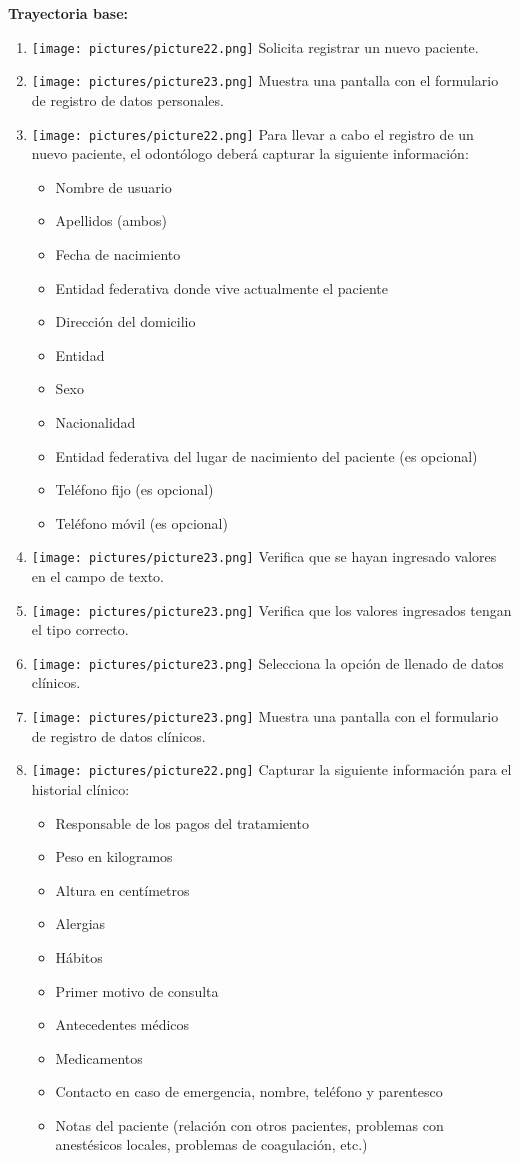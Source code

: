 \textbf{Trayectoria base:}        
\begin{enumerate}
\item \texttt{[image: pictures/picture22.png]} Solicita registrar un nuevo paciente.
\item \texttt{[image: pictures/picture23.png]} Muestra una pantalla con el formulario de registro de datos personales.
\item \texttt{[image: pictures/picture22.png]} Para llevar a cabo el registro de un nuevo paciente, el odontólogo deberá capturar la siguiente información:

\begin{itemize}[nosep]
\item Nombre de usuario
\item Apellidos (ambos)
\item Fecha de nacimiento
\item Entidad federativa donde vive actualmente el paciente
\item Dirección del domicilio
\item Entidad 
\item Sexo
\item Nacionalidad
\item Entidad federativa del lugar de nacimiento del paciente (es opcional)
\item Teléfono fijo (es opcional)
\item Teléfono móvil (es opcional)
\end{itemize}
\vspace{0.2em}

\item \texttt{[image: pictures/picture23.png]} Verifica que se hayan ingresado valores en el campo de texto.
\item \texttt{[image: pictures/picture23.png]} Verifica que los valores ingresados tengan el tipo correcto.
\item \texttt{[image: pictures/picture23.png]} Selecciona la opción de llenado de datos clínicos.
\item \texttt{[image: pictures/picture23.png]} Muestra una pantalla con el formulario de registro de datos clínicos.
\item \texttt{[image: pictures/picture22.png]} Capturar la siguiente información para el historial clínico:
\begin{itemize}[nosep]
\item Responsable de los pagos del tratamiento
\item Peso en kilogramos
\item Altura en centímetros
\item Alergias
\item Hábitos
\item Primer motivo de consulta
\item Antecedentes médicos
\item Medicamentos
\item Contacto en caso de emergencia, nombre, teléfono y parentesco
\item Notas del paciente (relación con otros pacientes, problemas con anestésicos locales, problemas de coagulación, etc.)
\end{itemize}
\vspace{0.2em}
\end{enumerate}
